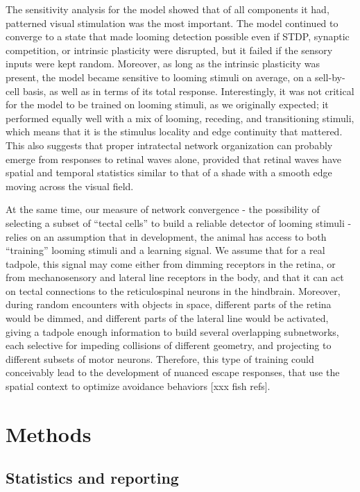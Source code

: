 \documentclass{article}
\begin{document}
The sensitivity analysis for the model showed that of all components it had, patterned visual stimulation was the most important. The model continued to converge to a state that made looming detection possible even if STDP, synaptic competition, or intrinsic plasticity were disrupted, but it failed if the sensory inputs were kept random. Moreover, as long as the intrinsic plasticity was present, the model became sensitive to looming stimuli on average, on a sell-by-cell basis, as well as in terms of its total response. Interestingly, it was not critical for the model to be trained on looming stimuli, as we originally expected; it performed equally well with a mix of looming, receding, and transitioning stimuli, which means that it is the stimulus locality and edge continuity that mattered. This also suggests that proper intratectal network organization can probably emerge from responses to retinal waves alone, provided that retinal waves have spatial and temporal statistics similar to that of a shade with a smooth edge moving across the visual field.

At the same time, our measure of network convergence - the possibility of selecting a subset of “tectal cells” to build a reliable detector of looming stimuli - relies on an assumption that in development, the animal has access to both “training” looming stimuli and a learning signal. We assume that for a real tadpole, this signal may come either from dimming receptors in the retina, or from mechanosensory and lateral line receptors in the body, and that it can act on tectal connections to the reticulospinal neurons in the hindbrain. Moreover, during random encounters with objects in space, different parts of the retina would be dimmed, and different parts of the lateral line would be activated, giving a tadpole enough information to build several overlapping subnetworks, each selective for impeding collisions of different geometry, and projecting to different subsets of motor neurons. Therefore, this type of training could conceivably lead to the development of nuanced escape responses, that use the spatial context to optimize avoidance behaviors \citep{khakhalin2014}[xxx fish refs].

\section*{Methods}

\subsection*{Statistics and reporting}
\end{document}
